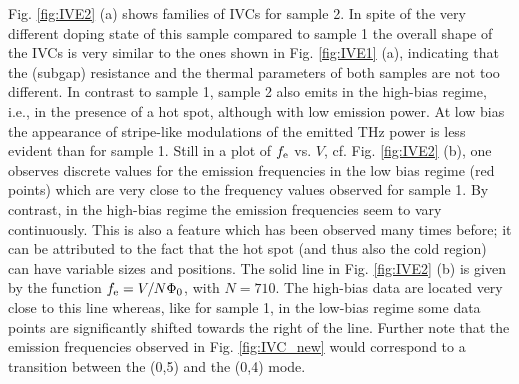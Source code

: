 \documentclass[aps,twocolumn,prb,showpacs,preprintnumbers,superscriptaddress,amsmath,amssymb,longbibliography]{revtex4-1}
\begin{document}
Fig. \ref{fig:IVE2} (a) shows families of IVCs for sample 2. In spite of the very different doping state of this sample compared to sample 1 the overall shape of the IVCs is very similar to the ones shown in Fig. \ref{fig:IVE1} (a), indicating that the (subgap) resistance and the thermal parameters of both samples are not too different. In contrast to sample 1, sample 2 also emits in the high-bias regime, i.e., in the presence of a hot spot, although with low emission power. At low bias the appearance of stripe-like modulations of the emitted THz power is less evident than for sample 1. Still in a plot of  $f_{\rm e}$ vs. $V$, cf. Fig. \ref{fig:IVE2} (b), one observes discrete values for the emission frequencies in the low bias regime (red points) which are very close to the frequency values observed for sample 1. By contrast, in the high-bias regime the emission frequencies seem to vary continuously. This is also a feature which has been observed many times before; it can be attributed to the fact that the hot spot (and thus also the cold region) can have variable sizes and positions. The solid line in Fig. \ref{fig:IVE2} (b) is given by the function $f_{\rm e} = V/N\Phi_0$, with $N = 710$. The high-bias data are located very close to this line whereas, like for sample  1, in the low-bias regime some data points are significantly shifted towards the right of the line.
Further note that the emission frequencies observed in Fig. \ref{fig:IVC_new} would correspond to a transition between the (0,5) and the (0,4) mode.  

 
\end{document}
